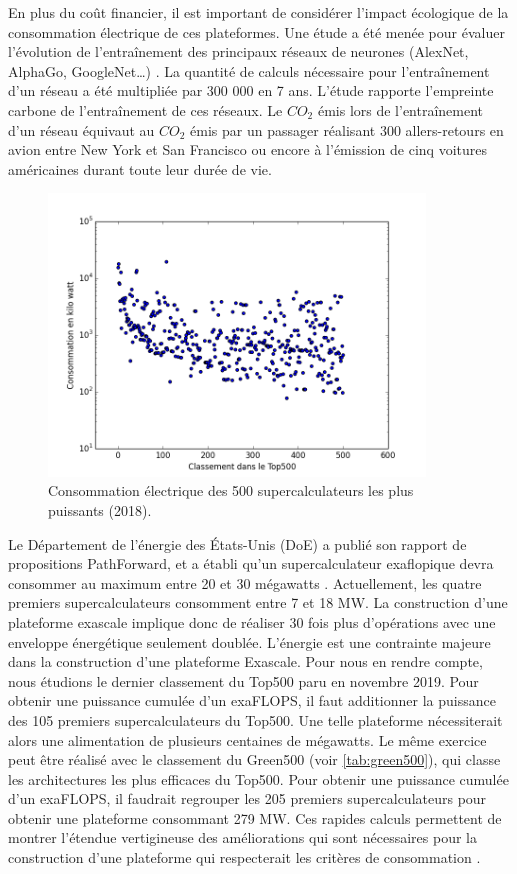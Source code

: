         En plus du coût financier, il est important de considérer l'impact écologique de la consommation électrique de ces plateformes. Une étude a été menée pour évaluer l’évolution de l’entraînement des principaux réseaux de neurones (AlexNet, AlphaGo, GoogleNet…) \cite{strubell-etal-2019-energy}. La quantité de calculs nécessaire pour l’entraînement d’un réseau a été multipliée par 300 000 en 7 ans. L’étude rapporte l’empreinte carbone de l’entraînement de ces réseaux. Le $CO_2$ émis lors de l'entraînement d’un réseau équivaut au $CO_2$ émis par un passager réalisant 300 allers-retours en avion entre New York et San Francisco ou encore à l’émission de cinq voitures américaines durant toute leur durée de vie.
                
                \begin{figure}
                    \center
                    \includegraphics[width=10cm]{images/Chapitre1/pic_top500_power.png}
                    \caption{\label{pic_top500_power} Consommation électrique des 500 supercalculateurs les plus puissants (2018).}
                \end{figure}
      
      
        Le Département de l'énergie des États-Unis (DoE) a publié son rapport de propositions PathForward, et a établi qu'un supercalculateur exaflopique devra consommer au maximum entre 20 et 30 mégawatts \cite{Ang2016}. Actuellement, les quatre premiers supercalculateurs consomment entre 7 et 18 MW. La construction d'une plateforme exascale implique donc de réaliser 30 fois plus d'opérations avec une enveloppe énergétique seulement doublée. L'énergie est une contrainte majeure dans la construction d'une plateforme Exascale. Pour nous en rendre compte, nous étudions le dernier classement du Top500 paru en novembre 2019. Pour obtenir une puissance cumulée d'un exaFLOPS, il faut additionner la puissance des 105 premiers supercalculateurs du Top500. Une telle plateforme nécessiterait alors une alimentation de plusieurs centaines de mégawatts. Le même exercice peut être réalisé avec le classement du Green500 (voir \autoref{tab:green500}), qui classe les architectures les plus efficaces du Top500. Pour obtenir une puissance cumulée d'un exaFLOPS, il faudrait regrouper les 205 premiers supercalculateurs pour obtenir une plateforme consommant 279 MW. Ces rapides calculs permettent de montrer l'étendue vertigineuse des améliorations qui sont nécessaires pour la construction d'une plateforme qui respecterait les critères de consommation \cite{Ang2016}. 
        

